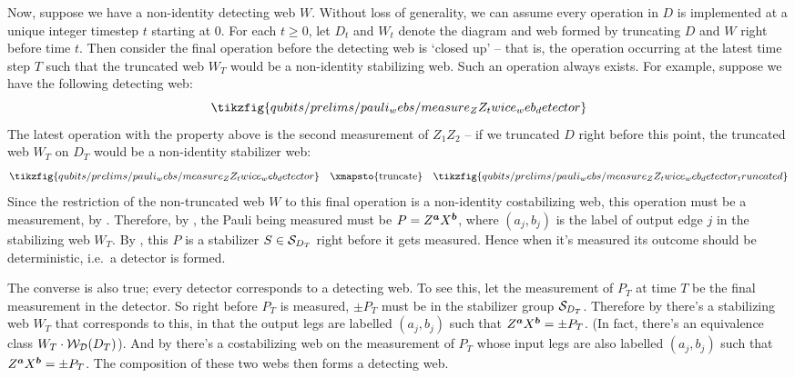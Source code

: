 Now, suppose we have a non-identity detecting web $W$.
Without loss of generality, we can assume every operation in $D$ is implemented at a unique integer timestep $t$ starting at $0$.
For each $t \geq 0$, let $D_t$ and $W_t$ denote the diagram and web formed by truncating $D$ and $W$ right before time $t$.
Then consider the final operation before the detecting web is `closed up' -- that is, the operation occurring at the latest time step $T$ such that the truncated web $W_T$ would be a non-identity stabilizing web.
Such an operation always exists.
For example, suppose we have the following detecting web:
\begin{equation}
    \tikzfig{qubits/prelims/pauli_webs/measure_ZZ_twice_web_detector}
\end{equation}
The latest operation with the property above is the second measurement of $Z_1 Z_2$ -- if we truncated $D$ right before this point, the truncated web $W_T$ on $D_T$ would be a non-identity stabilizer web:
\begin{equation}
    \tikzfig{qubits/prelims/pauli_webs/measure_ZZ_twice_web_detector}
    \quad \xmapsto{\text{truncate}} \quad
    \tikzfig{qubits/prelims/pauli_webs/measure_ZZ_twice_web_detector_truncated}
\end{equation}
Since the restriction of the non-truncated web $W$ to this final operation is a non-identity costabilizing web, this operation must be a measurement, by .
Therefore, by , the Pauli being measured must be $P = Z^{\boldsymbol{a}}X^{\boldsymbol{b}}$, where $(a_j, b_j)$ is the label of output edge $j$ in the stabilizing web $W_T$.
By , this $P$ is a stabilizer $S \in \mathcal{S}_{D_T}$ right before it gets measured.
Hence when it's measured its outcome should be deterministic, i.e.\ a detector is formed.

The converse is also true; every detector corresponds to a detecting web.
To see this, let the measurement of $P_T$ at time $T$ be the final measurement in the detector.
So right before $P_T$ is measured, $\pm P_T$ must be in the stabilizer group $\mathcal{S}_{D_T}$.
Therefore by  there's a stabilizing web $W_T$ that corresponds to this, in that the output legs are labelled $(a_j, b_j)$ such that $Z^{\boldsymbol{a}}X^{\boldsymbol{b}} = \pm P_T$.
(In fact, there's an equivalence class $W_T \cdot \mathcal{W}_{\mathcal{D}}(D_T)$).
And by  there's a costabilizing web on the measurement of $P_T$ whose input legs are also labelled $(a_j, b_j)$ such that $Z^{\boldsymbol{a}}X^{\boldsymbol{b}} = \pm P_T$.
The composition of these two webs then forms a detecting web.

